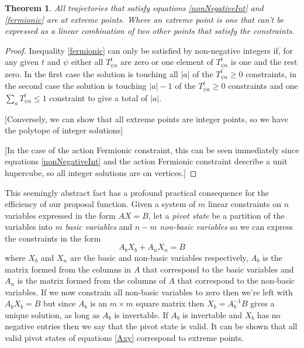 \documentclass{article}
\newtheorem{theorem}{Theorem}
\begin{document}
\begin{theorem}
	All trajectories that satisfy equations \ref{nonNegativeInt} and \ref{fermionic} are at extreme points. Where an extreme point is one that can't be expressed as a linear combination of two other points that satisfy the constraints.
\end{theorem}
\begin{proof}
	
	Inequality \ref{fermionic} can only be satisfied by non-negative integers if, for any given $t$ and $\psi$ either all $T^t_{\psi a}$ are zero or one element of $T^t_{\psi a}$ is one and the rest zero. In the first case the solution is touching all $|a|$ of the $T^t_{\psi a} \ge 0$ constraints, in the second case the solution is touching $|a|-1$ of the $T^t_{\psi a} \ge 0$ constraints and one $\sum_a T^t_{\psi a} \le 1$ constraint to give a total of $|a|$.
	
	[Conversely, we can show that all extreme points are integer points, so we have the polytope of integer solutions]
	
	[In the case of the action Fermionic constraint, this can be seen immediately since equations \ref{nonNegativeInt} and the action Fermionic constraint describe a unit hupercube, so all integer solutions are on vertices.]
	
\end{proof}


This seemingly abstract fact has a profound practical consequence for the efficiency of our proposal function.
Given a system of $m$ linear constraints on $n$ variables expressed in the form $AX=B$, let a \textit{pivot state} be a partition of the variables into $m$ \textit{basic variables} and $n-m$ \textit{non-basic variables} so we can express the constraints in the form
\begin{equation}
A_bX_b + A_nX_n = B
\label{tableau1}
\end{equation}
where $X_b$ and $X_n$ are the basic and non-basic variables respectively, $A_b$ is the matrix formed from the columns in $A$ that correspond to the basic variables and $A_n$ is the matrix formed from the columns of $A$ that correspond to the non-basic variables. If we now constrain all non-basic variables to zero then we're left with $A_bX_b = B$ but since $A_b$ is an $m \times m$ square matrix then $X_b = A_b^{-1}B$ gives a unique solution, as long as $A_b$ is invertable. If $A_b$ is invertable and $X_b$ has no negative entries then we say that the pivot state is valid. It can be shown that all valid pivot states of equations \ref{Axy} correspond to extreme points\cite{dantzig1955generalized}.
\end{document}
